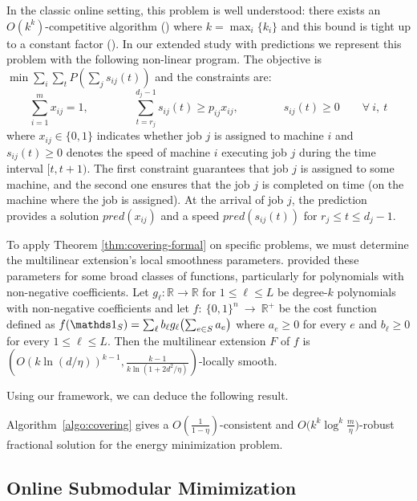 In the classic online setting, this problem is well understood: there exists an $O(k^{k})$-competitive algorithm (\cite{Thang20:Online-Primal-Dual}) where $k = \max_{i} \{k_{i}\}$
and this bound is tight up to a constant factor (\cite{Caragiannis08:Better-bounds}). In our extended study with predictions we represent this problem with the following non-linear program. The objective is $\min \sum_{i} \sum_{t} P(\sum_{j} s_{ij}(t))$ and the constraints are:
$$
\sum_{i=1}^{m} x_{ij} = 1,  \qquad \qquad \sum_{t = r_{j}}^{d_{j}-1} s_{ij}(t) \geq p_{ij} x_{ij}, \qquad  \qquad s_{ij}(t) \geq 0  \qquad \forall\ i,\ t
$$
where $x_{ij} \in \{0,1\}$ indicates whether job $j$ is assigned to machine $i$
and $s_{ij}(t) \geq 0$ denotes the speed of machine $i$ executing job $j$ during the time interval $[t, t+1)$.
The first constraint guarantees that job $j$ is assigned to some machine, and the second one ensures
that the job $j$ is completed on time (on the machine where the job is assigned). At the arrival of
job $j$, the prediction provides a solution $pred(x_{ij})$ and a speed $pred(s_{ij}(t))$ for $r_{j} \leq t \leq d_{j} - 1$.


To apply Theorem \ref{thm:covering-formal} on specific problems, we must determine the multilinear extension's local smoothness parameters.
\cite{Thang20:Online-Primal-Dual} provided these parameters for some broad classes of functions, particularly for polynomials with non-negative coefficients. Let $g_{\ell}: \mathbb{R} \rightarrow \mathbb{R}$ for $1 \leq \ell \leq L$
be degree-$k$ polynomials with non-negative coefficients and let $f:~\{0,1\}^{n}~\rightarrow~\mathbb{R}^{+}$ be the cost function
defined as $f(\one_{S}) = \sum_{\ell} b_{\ell} g_{\ell}\bigl( \sum_{e \in S} a_{e} \bigr)$ where $a_{e} \geq 0$ for every
$e$ and $b_{\ell} \geq 0$ for every $1 \leq \ell \leq L$.
Then the multilinear extension $F$ of $f$ is $(O(k \ln(d/\eta))^{k-1}, \frac{k-1}{k \ln(1 + 2d^{2}/\eta)})$-locally smooth.



Using our framework, we can deduce the following result.

\begin{proposition}
Algorithm~\ref{algo:covering} gives a
$O(\frac{1}{1 - \eta})$-consistent and $O\bigl(k^{k} \log^{k} \frac{m}{\eta}\bigr)$-robust fractional solution
for the energy minimization problem.
\end{proposition}


\subsection{Online Submodular Mimimization}	\label{sec:sub-min}

